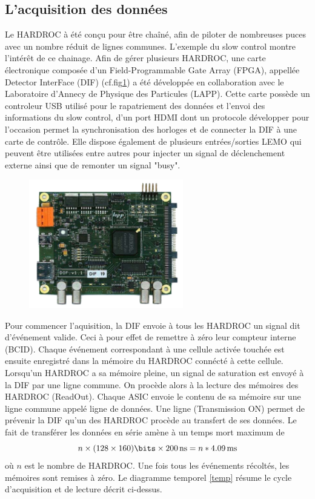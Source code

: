 \subsection{L'acquisition des données}
Le HARDROC à été conçu pour être chaîné, afin de piloter de nombreuses puces avec un nombre réduit de lignes communes. L'exemple du slow control montre l'intérêt de ce chainage. Afin de gérer plusieurs HARDROC, une carte électronique composée d'un Field-Programmable Gate Array (FPGA), appellée Detector InterFace (DIF) (cf.fig\ref{DIF}) a été développée en collaboration avec le Laboratoire d'Annecy de Physique des Particules (LAPP). Cette carte possède un controleur USB utilisé pour le rapatriement des données et l'envoi des informations du slow control, d'un port HDMI dont un protocole développer pour l'occasion permet la synchronisation des horloges et de connecter la DIF à une carte de contrôle. Elle dispose également de plusieurs entrées/sorties LEMO qui peuvent être utilisées entre autres pour injecter un signal de déclenchement externe ainsi que de remonter un signal "busy".

\begin{figure}[ht!]
	\centering
	\includegraphics[width=0.6\textwidth]{GLA/DIF.png}
	\label{DIF}
\end{figure}

Pour commencer l'aquisition, la DIF envoie à tous les HARDROC un signal dit d'événement valide. Ceci à pour effet de remettre à zéro leur compteur interne (BCID). Chaque événement correspondant à une cellule activée touchée est ensuite enregistré dans la mémoire du HARDROC connécté à cette cellule. Lorsqu'un HARDROC a sa mémoire pleine, un signal de saturation est envoyé à la DIF par une ligne commune. On procède alors à la lecture des mémoires des HARDROC (ReadOut). Chaque ASIC envoie le contenu de sa mémoire sur une ligne commune appelé ligne de données. Une ligne (Transmission ON) permet de prévenir la DIF qu'un des HARDROC procède au transfert de ses données. Le fait de transférer les données en série amène à un temps mort maximum de
\begin{equation}
n\times(128 \times 160)\si{\bits}\times \SI{200}{\nano\second}= n*\SI{4.09}{\milli\second}
\end{equation} 
où $n$ est le nombre de HARDROC. Une fois tous les événements récoltés, les mémoires sont remises à zéro. Le diagramme temporel \ref{temp} résume le cycle d'acquisition et de lecture décrit ci-dessus.

